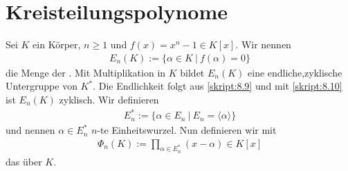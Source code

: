 \section{Kreisteilungspolynome}

\begin{df}\label{skript:11.1}
	Sei $K$ ein Körper, $n \geq 1$ und $f(x) = x^n -1 \in K[x]$.
	Wir nennen
	\begin{align*}
	E_n(K) := \lbrace \alpha \in K\ | \ f(\alpha) = 0 \rbrace 
	\end{align*}
	die Menge der .
	Mit Multiplikation in $K$ bildet $E_n(K)$ eine endliche,zyklische Untergruppe von $K^\ast$.
	Die Endlichkeit folgt aus \ref{skript:8.9} und mit \ref{skript:8.10} ist $E_n(K)$ zyklisch.
	Wir definieren
	\begin{align*}
	E_n^\ast := \lbrace \alpha \in E_n \ | \ E_n = \langle \alpha \rangle \rbrace
	\end{align*}
	und nennen $\alpha \in E_n^\ast$  $n$-te Einheitswurzel.
	Nun definieren wir mit
	\begin{align*}
	\Phi_n(K) := \prod_{\alpha \in E_n^\ast} (x - \alpha) \in K[x]
	\end{align*}
	das  über $K$.		 
\end{df}

